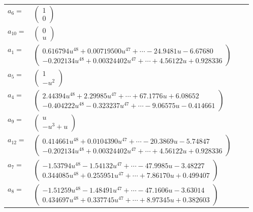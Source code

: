 \documentclass[1p]{elsarticle_modified}
\theoremstyle{definition}
\begin{document}
\begin{tabular}{m{7pt} m{180pt} m{7pt} m{180pt} }
\flushright $a_{6}=$&$\begin{pmatrix}1\\0\end{pmatrix}$ \\
\flushright $a_{10}=$&$\begin{pmatrix}0\\u\end{pmatrix}$ \\
\flushright $a_{1}=$&$\begin{pmatrix}0.616794 u^{48}+0.00719500 u^{47}+\cdots-24.9481 u-6.67680\\-0.202134 u^{48}+0.00324402 u^{47}+\cdots+4.56122 u+0.928336\end{pmatrix}$ \\
\flushright $a_{5}=$&$\begin{pmatrix}1\\- u^2\end{pmatrix}$ \\
\flushright $a_{4}=$&$\begin{pmatrix}2.44394 u^{48}+2.29985 u^{47}+\cdots+67.1776 u+6.08652\\-0.404222 u^{48}-0.323237 u^{47}+\cdots-9.06575 u-0.414661\end{pmatrix}$ \\
\flushright $a_{9}=$&$\begin{pmatrix}u\\- u^3+u\end{pmatrix}$ \\
\flushright $a_{12}=$&$\begin{pmatrix}0.414661 u^{48}+0.0104390 u^{47}+\cdots-20.3869 u-5.74847\\-0.202134 u^{48}+0.00324402 u^{47}+\cdots+4.56122 u+0.928336\end{pmatrix}$ \\
\flushright $a_{7}=$&$\begin{pmatrix}-1.53794 u^{48}-1.54132 u^{47}+\cdots-47.9985 u-3.48227\\0.344085 u^{48}+0.255951 u^{47}+\cdots+7.86170 u+0.499407\end{pmatrix}$ \\
\flushright $a_{8}=$&$\begin{pmatrix}-1.51259 u^{48}-1.48491 u^{47}+\cdots-47.1606 u-3.63014\\0.434697 u^{48}+0.337745 u^{47}+\cdots+8.97345 u+0.382603\end{pmatrix}$ \\

\end{tabular}
\end{document}

